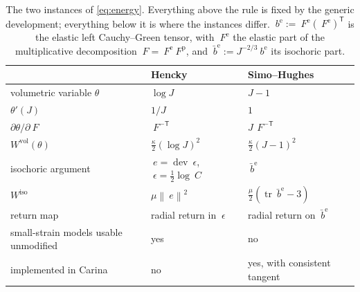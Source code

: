 \documentclass{article}
\newcommand{\F}{~F}
\newcommand{\C}{~C}
\newcommand{\eps}{~\epsilon}
\newcommand{\edev}{~e}
\newcommand{\dev}{\operatorname{dev}}
\newcommand{\trace}{\operatorname{tr}}
\newcommand{\transpose}[1]{#1^{\mathsf{T}}}
\newcommand{\norm}[1]{\left\lVert #1 \right\rVert}
\newcommand{\supvol}{^{\mathrm{vol}}}
\newcommand{\supiso}{^{\mathrm{iso}}}
\theoremstyle{definition}
\theoremstyle{plain}
\begin{document}
\begin{table}[tbp]
  \centering
  \caption{The two instances of \eqref{eq:energy}. Everything above the rule is
  fixed by the generic development; everything below it is where the instances
  differ. $~b^{\mathrm e} := \F^{\mathrm e}\transpose{(\F^{\mathrm e})}$
  is the elastic left Cauchy--Green tensor, with $\F^{\mathrm e}$ the elastic
  part of the multiplicative decomposition $\F = \F^{\mathrm e}\F^{\mathrm p}$, and
  $\bar{~b}^{\mathrm e} := J^{-2/3}~b^{\mathrm e}$ its isochoric part.}
  \label{tab:instances}
  \begin{tabular}{lll}
    \toprule
                                & Hencky                       & Simo--Hughes \\
    \midrule
    volumetric variable $\theta$          & $\log J$           & $J - 1$ \\
    $\theta'(J)$                          & $1/J$              & $1$ \\
    $\partial\theta/\partial\F$           & $\F^{-\mathsf T}$  & $J\,\F^{-\mathsf T}$ \\
    $W\supvol(\theta)$                    & $\tfrac{\kappa}{2}(\log J)^2$ & $\tfrac{\kappa}{2}(J-1)^2$ \\
    \midrule
    isochoric argument                    & $\edev = \dev\eps$, $\eps = \tfrac12\log\C$
                                                               & $\bar{~b}^{\mathrm e}$ \\
    $W\supiso$                            & $\mu\norm{\edev}^2$
                                                               & $\tfrac{\mu}{2}(\trace\bar{~b}^{\mathrm e} - 3)$ \\
    return map                            & radial return in $\eps$ & radial return on $\bar{~b}^{\mathrm e}$ \\
    small-strain models usable unmodified & yes                & no \\
    implemented in Carina                 & no                 & yes, with consistent tangent \\
    \bottomrule
  \end{tabular}
\end{table}
\end{document}
